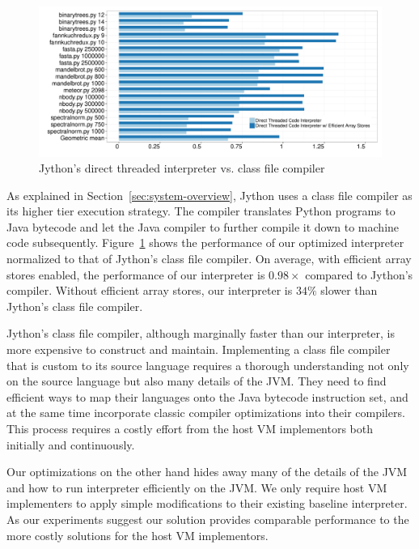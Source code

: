 \begin{figure}
\centering
\includegraphics[scale=.42]{figures/ch2-benchmark-jython-direct-threading-compiler.pdf}
\caption{Jython's direct threaded interpreter vs. class file compiler}
\label{fig:benchmark-jython-direct-threading-compiler}
\end{figure}

As explained in Section~\ref{sec:system-overview}, Jython uses a class file compiler as its higher tier execution strategy.
The compiler translates Python programs to Java bytecode and let the Java compiler to further compile it down to machine code subsequently.
Figure~\ref{fig:benchmark-jython-direct-threading-compiler} shows the performance of our optimized interpreter normalized to that of Jython's class file compiler.
On average, with efficient array stores enabled, the performance of our interpreter is $0.98\times$ compared to Jython's compiler.
Without efficient array stores, our interpreter is $34\%$ slower than Jython's class file compiler.

Jython's class file compiler, although marginally faster than our interpreter, is more expensive to construct and maintain.
Implementing a class file compiler that is custom to its source language requires a thorough understanding not only on the source language but also many details of the JVM.
They need to find efficient ways to map their languages onto the Java bytecode instruction set, and at the same time incorporate classic compiler optimizations into their compilers.
This process requires a costly effort from the host VM implementors both initially and continuously.

Our optimizations on the other hand hides away many of the details of the JVM and how to run interpreter efficiently on the JVM.
We only require host VM implementers to apply simple modifications to their existing baseline interpreter.
As our experiments suggest our solution provides comparable performance to the more costly solutions for the host VM implementors.
